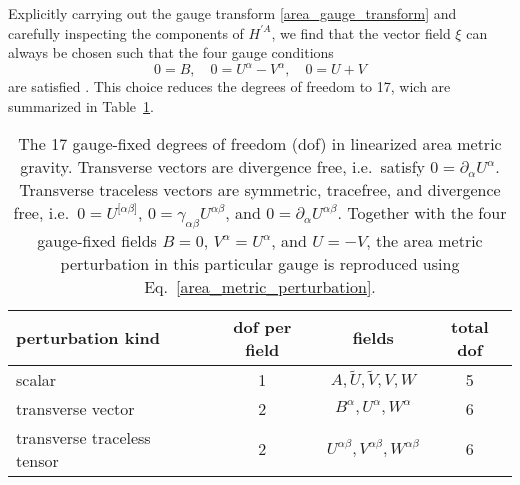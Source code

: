 Explicitly carrying out the gauge transform \eqref{area_gauge_transform} and carefully inspecting the components of $H^{\prime A}$, we find that the vector field $\xi$ can always be chosen such that the four gauge conditions
\begin{equation}
  0 = B,\quad 0 = U^\alpha - V^\alpha,\quad 0 = U + V
\end{equation}
are satisfied \cite{Schneider_2017}. This choice reduces the degrees of freedom to 17, wich are summarized in Table~\ref{table_area_dof}.
\begin{table}
  \centering
  \begin{tabular}{l c c c}
    \toprule
    perturbation kind & dof per field & fields & total dof \\
    \midrule
    scalar & 1 & $A,\tilde U,\tilde V,V,W$ & 5 \\
    transverse vector & 2 & $B^\alpha,U^\alpha,W^\alpha$ & 6 \\
    transverse traceless tensor & 2 & $U^{\alpha\beta},V^{\alpha\beta},W^{\alpha\beta}$ & 6 \\
    \bottomrule 
  \end{tabular}
  \caption{The 17 gauge-fixed degrees of freedom (dof) in linearized area metric gravity. Transverse vectors are divergence free, i.e.~satisfy $0 = \partial_\alpha U^\alpha$. Transverse traceless vectors are symmetric, tracefree, and divergence free, i.e.~$0 = U^{\lbrack\alpha\beta\rbrack}$, $0 = \gamma_{\alpha\beta} U^{\alpha\beta}$, and $0 = \partial_\alpha U^{\alpha\beta}$. Together with the four gauge-fixed fields $B=0$, $V^\alpha = U^\alpha$, and $U=-V$, the area metric perturbation in this particular gauge is reproduced using Eq.~\eqref{area_metric_perturbation}.}
  \label{table_area_dof}
\end{table}

